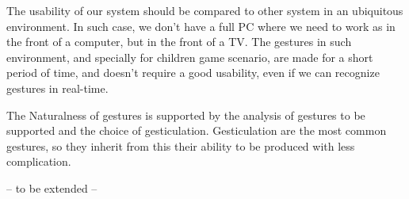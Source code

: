 \documentclass{llncs}
\newcommand\ignore[1]{}
\begin{document}
The usability of our system should be compared to other system in an ubiquitous
environment. In such case, we don't have a full PC where we need to work as in
the front of a computer, but in the front of a TV.
The gestures in such environment, and specially for children game scenario,
are made for a short period of time, and doesn't require a good usability,
even if we can recognize gestures in real-time.

The Naturalness of gestures is supported by the analysis of gestures to be
supported and the choice of gesticulation.
Gesticulation are the most common gestures, so they inherit from this their
ability to be produced with less complication.

-- to be extended --

\ignore{
Naturalness came from the analysis of gestures used in talk shows.
(gestures used many times means nature gestures)
Reverse thinking.
Usability in the context of RevTV ??
}


\end{document}
